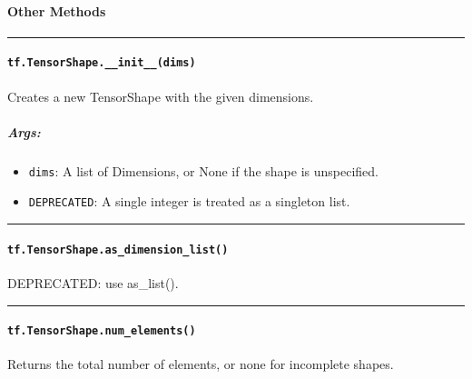 \paragraph{Other Methods }\label{other-methods-3}

\begin{center}\rule{0.5\linewidth}{\linethickness}\end{center}

\paragraph{\texorpdfstring{\lstinline{tf.TensorShape.__init__(dims)}
}{tf.TensorShape.__init__(dims) }}\label{tf.tensorshape.ux5fux5finitux5fux5fdims}

Creates a new TensorShape with the given dimensions.

\subparagraph{Args: }\label{args-39}

\begin{itemize}
\tightlist
\item
  \lstinline{dims}: A list of Dimensions, or None if the shape is
  unspecified.
\item
  \lstinline{DEPRECATED}: A single integer is treated as a singleton list.
\end{itemize}

\begin{center}\rule{0.5\linewidth}{\linethickness}\end{center}

\paragraph{\texorpdfstring{\lstinline{tf.TensorShape.as_dimension_list()}
}{tf.TensorShape.as_dimension_list() }}\label{tf.tensorshape.asux5fdimensionux5flist}

DEPRECATED: use as_list().

\begin{center}\rule{0.5\linewidth}{\linethickness}\end{center}

\paragraph{\texorpdfstring{\lstinline{tf.TensorShape.num_elements()}
}{tf.TensorShape.num_elements() }}\label{tf.tensorshape.numux5felements}

Returns the total number of elements, or none for incomplete shapes.

